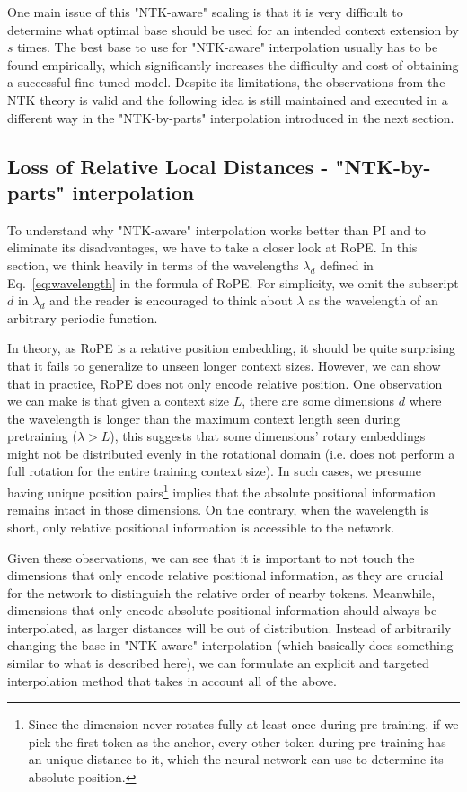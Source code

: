 One main issue of this "NTK-aware" scaling is that it is very difficult to determine what optimal base should be used for an intended context extension by $s$ times. The best base to use for "NTK-aware" interpolation usually has to be found empirically, which significantly increases the difficulty and cost of obtaining a successful fine-tuned model. Despite its limitations, the observations from the NTK theory is valid and the following idea is still maintained and executed in a different way in the "NTK-by-parts" interpolation introduced in the next section.

\subsection{Loss of Relative Local Distances - "NTK-by-parts" interpolation} \label{sec:ntkparts} 

To understand why "NTK-aware" interpolation works better than PI and to eliminate its disadvantages, we have to take a closer look at RoPE. In this section, we think heavily in terms of the wavelengths $\lambda_d$ defined in Eq.~\ref{eq:wavelength} in the formula of RoPE. For simplicity, we omit the subscript $d$ in $\lambda_d$ and the reader is encouraged to think about $\lambda$ as the wavelength of an arbitrary periodic function.

In theory, as RoPE is a relative position embedding, it should be quite surprising that it fails to generalize to unseen longer context sizes. However, we can show that in practice, RoPE does not only encode relative position. One observation we can make is that given a context size $L$, there are some dimensions $d$ where the wavelength is longer than the maximum context length seen during pretraining ($\lambda > L$), this suggests that some dimensions' rotary embeddings might not be distributed evenly in the rotational domain (i.e. does not perform a full rotation for the entire training context size). In such cases, we presume having unique position pairs\footnote{Since the dimension never rotates fully at least once during pre-training, if we pick the first token as the anchor, every other token during pre-training has an unique distance to it, which the neural network can use to determine its absolute position.} implies that the absolute positional information remains intact in those dimensions. On the contrary, when the wavelength is short, only relative positional information is accessible to the network.

Given these observations, we can see that it is important to not touch the dimensions that only encode relative positional information, as they are crucial for the network to distinguish the relative order of nearby tokens. Meanwhile, dimensions that only encode absolute positional information should always be interpolated, as larger distances will be out of distribution. Instead of arbitrarily changing the base in "NTK-aware" interpolation (which basically does something similar to what is described here), we can formulate an explicit and targeted interpolation method that takes in account all of the above.

